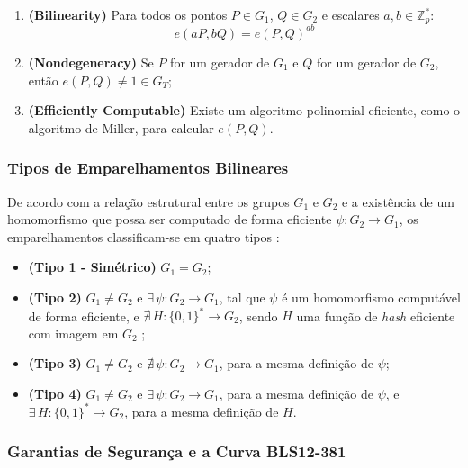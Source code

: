 \begin{enumerate}
    \item \textbf{(Bilinearity)} Para todos os pontos $P \in G_1$, $Q \in G_2$ e escalares $a, b \in \mathbb{Z}_p^*$:
    \begin{equation*}
        e(aP, bQ) = e(P, Q)^{ab}
    \end{equation*}
    \item \textbf{(Nondegeneracy)} Se $P$ for um gerador de $G_1$ e $Q$ for um gerador de $G_2$, então $e(P, Q) \neq 1 \in G_T$;
    \item \textbf{(Efficiently Computable)} Existe um algoritmo polinomial eficiente, como o algoritmo de Miller, para calcular $e(P, Q)$.
\end{enumerate}

\subsubsection{Tipos de Emparelhamentos Bilineares}

De acordo com a relação estrutural entre os grupos $G_1$ e $G_2$ e a existência de um homomorfismo que possa ser computado de forma eficiente $\psi : G_2 \rightarrow G_1$, os emparelhamentos classificam-se em quatro tipos \cite{salin2023pairing}:

\begin{itemize}
    \item \textbf{(Tipo 1 - Simétrico)} $G_1 = G_2$;
    \item \textbf{(Tipo 2)} $G_1 \neq G_2$ e $\exists \, \psi : G_2 \rightarrow G_1$, tal que $\psi$ é um homomorfismo computável de forma eficiente, e $\nexists \, H : \{0,1\}^* \rightarrow G_2$, sendo $H$ uma função de \textit{hash} eficiente com imagem em $G_2$ \cite{salin2023pairing};
    \item \textbf{(Tipo 3)} $G_1 \neq G_2$ e $\nexists \, \psi : G_2 \rightarrow G_1$, para a mesma definição de $\psi$;
    \item \textbf{(Tipo 4)} $G_1 \neq G_2$ e $\exists \, \psi : G_2 \rightarrow G_1$, para a mesma definição de $\psi$, e $\exists \, H : \{0,1\}^* \rightarrow G_2$, para a mesma definição de $H$.
\end{itemize}

\subsubsection{Garantias de Segurança e a Curva BLS12-381}
\label{ssec:curva_bls12381}

